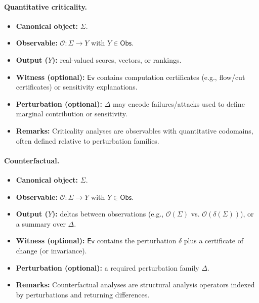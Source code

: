 \documentclass[11pt]{article}
\begin{document}
\paragraph{Quantitative criticality.}
\begin{itemize}[leftmargin=*]
  \item \textbf{Canonical object:} $\Sigma$.
  \item \textbf{Observable:} $\mathcal O: \Sigma\to Y$ with $Y\in\mathsf{Obs}$.
  \item \textbf{Output ($Y$):} real-valued scores, vectors, or rankings.
  \item \textbf{Witness (optional):} $\mathsf{Ev}$ contains computation certificates (e.g., flow/cut certificates) or sensitivity explanations.
  \item \textbf{Perturbation (optional):} $\Delta$ may encode failures/attacks used to define marginal contribution or sensitivity.
  \item \textbf{Remarks:} Criticality analyses are observables with quantitative codomains, often defined relative to perturbation families.
\end{itemize}

\paragraph{Counterfactual.}
\begin{itemize}[leftmargin=*]
  \item \textbf{Canonical object:} $\Sigma$.
  \item \textbf{Observable:} $\mathcal O: \Sigma\to Y$ with $Y\in\mathsf{Obs}$.
  \item \textbf{Output ($Y$):} deltas between observations (e.g., $\mathcal O(\Sigma)$ vs. $\mathcal O(\delta(\Sigma))$), or a summary over $\Delta$.
  \item \textbf{Witness (optional):} $\mathsf{Ev}$ contains the perturbation $\delta$ plus a certificate of change (or invariance).
  \item \textbf{Perturbation (optional):} a required perturbation family $\Delta$.
  \item \textbf{Remarks:} Counterfactual analyses are structural analysis operators indexed by perturbations and returning differences.
\end{itemize}
\end{document}
